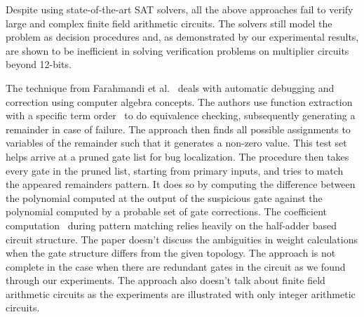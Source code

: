 Despite using state-of-the-art SAT solvers, all the above approaches fail to verify large and complex finite field arithmetic circuits. The solvers still model the problem as decision procedures and, as demonstrated by our experimental results, are shown to be inefficient in solving verification problems on multiplier circuits beyond 12-bits. 

The technique from Farahmandi et al.~\cite{farimah:2016} deals with automatic debugging and correction using computer algebra concepts. The authors use function extraction~\cite{maciej:2015:1} with a specific term order~\cite{lv} to do equivalence checking, subsequently generating a remainder in case of failure. The approach then finds all possible assignments to variables of the remainder such that it generates a non-zero value. This test set helps arrive at a pruned gate list for bug localization. The procedure then takes every gate in the pruned list, starting from primary inputs, and tries to match the appeared remainders pattern. It does so by computing the difference between the polynomial computed at the output of the suspicious gate against the polynomial computed by a probable set of gate corrections. The coefficient computation~\cite{maciej:2015:2} during pattern matching relies heavily on the half-adder based circuit structure. The paper doesn't discuss the ambiguities in weight calculations when the gate structure differs from the given topology. The approach is not complete in the case when there are redundant gates in the circuit as we found through our experiments. The approach also doesn't talk about finite field arithmetic circuits as the experiments are illustrated with only integer arithmetic circuits.




